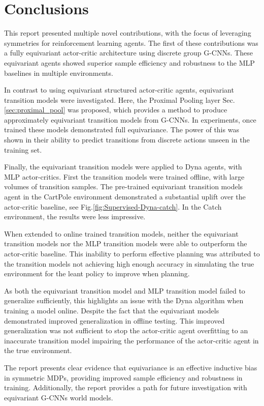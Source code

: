 \chapter{Conclusions}\label{sec:conclusions}
This report presented multiple novel contributions, with the focus of leveraging symmetries for reinforcement learning agents. The first of these contributions was a fully equivariant actor-critic architecture using discrete group G-CNNs. These equivariant agents showed superior sample efficiency and robustness to the MLP baselines in multiple environments.

In contrast to using equivariant structured actor-critic agents, equivariant transition models were investigated. Here, the Proximal Pooling layer Sec.\ref{sec:proximal_pool} was proposed, which provides a method to produce approximately equivariant transition models from G-CNNs. In experiments, once trained these models demonstrated full equivariance. The power of this was shown in their ability to predict transitions from discrete actions unseen in the training set.

Finally, the equivariant transition models were applied to Dyna agents, with MLP actor-critics. First the transition models were trained offline, with large volumes of transition samples. The pre-trained equivariant transition models agent in the CartPole environment demonstrated a substantial uplift over the actor-critic baseline, see Fig.\ref{fig:Supervised-Dyna-catch}. In the Catch environment, the results were less impressive.

When extended to online trained transition models, neither the equivariant transition models nor the MLP transition models were able to outperform the actor-critic baseline. This inability to perform effective planning was attributed to the transition models not achieving high enough accuracy in simulating the true environment for the leant policy to improve when planning.

As both the equivariant transition model and MLP transition model failed to generalize sufficiently, this highlights an issue with the Dyna algorithm when training a model online. Despite the fact that the equivariant models demonstrated improved generalization in offline testing. This improved generalization was not sufficient to stop the actor-critic agent overfitting to an inaccurate transition model impairing the performance of the actor-critic agent in the true environment.

The report presents clear evidence that equivariance is an effective inductive bias in symmetric MDPs, providing improved sample efficiency and robustness in training. Additionally, the report provides a path for future investigation with equivariant G-CNNs world models.


